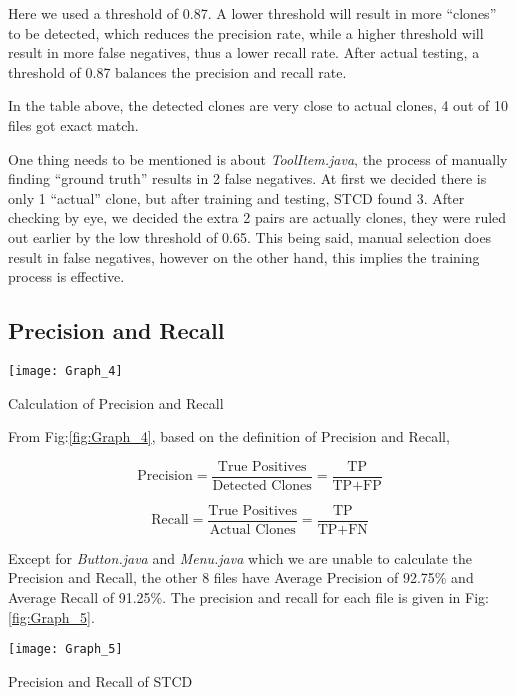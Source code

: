 \documentclass[../main.tex]{subfiles}
\begin{document}
Here we used a threshold of 0.87. A lower threshold will result in more ``clones'' to be detected, which reduces the precision rate, while a higher threshold will result in more false negatives, thus a lower recall rate. After actual testing, a threshold of 0.87 balances the precision and recall rate.

In the table above, the detected clones are very close to actual clones, 4 out of 10 files got exact match.

One thing needs to be mentioned is about \textit{ToolItem.java}, the process of manually finding ``ground truth'' results in 2 false negatives. At first we decided there is only 1 ``actual'' clone, but after training and testing, STCD found 3. After checking by eye, we decided the extra 2 pairs are actually clones, they were ruled out earlier by the low threshold of 0.65. This being said, manual selection does result in false negatives, however on the other hand, this implies the training process is effective.

\subsection{Precision and Recall}

\begin{figurehere}
\centering \texttt{[image: Graph\_4]} 
\caption{Calculation of Precision and Recall} \label{fig:Graph_4}
\end{figurehere}

From Fig:\ref{fig:Graph_4}, based on the definition of Precision and Recall, 

\begin{equation}
\text{Precision} = \frac{ \text{True Positives}} {\text{Detected Clones}} = \frac{ \text{TP}} {\text{TP} + \text{FP}}
\end{equation}

\begin{equation}
\text{Recall} = \frac{ \text{True Positives}} {\text{Actual Clones}} = \frac{ \text{TP}} {\text{TP} + \text{FN}}
\end{equation}

Except for \textit{Button.java} and \textit{Menu.java} which we are unable to calculate the Precision and Recall, the other 8 files have Average Precision of 92.75\% and Average Recall of 91.25\%. The precision and recall for each file is given in Fig:\ref{fig:Graph_5}.

\begin{figurehere}
\centering \texttt{[image: Graph\_5]} 
\caption{Precision and Recall of STCD} \label{fig:Graph_5}
\end{figurehere}
\end{document}
